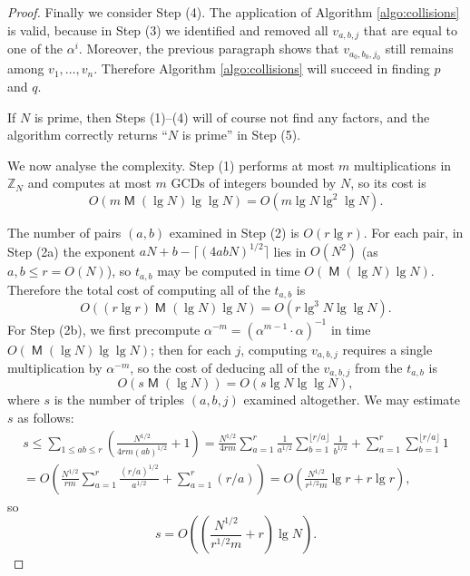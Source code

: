 \documentclass[reqno]{amsart}
\theoremstyle{remark}
\numberwithin{equation}{section}
\numberwithin{thm}{section}
\newcommand{\ZZ}{\mathbb{Z}}
\DeclareMathOperator{\MM}{\mathsf{M}}
\renewcommand{\leq}{\leqslant}
\begin{document}
\begin{proof}
  Finally we consider Step (4).
  The application of Algorithm \ref{algo:collisions} is valid,
  because in Step (3) we identified and removed all $v_{a,b,j}$ that are
  equal to one of the $\alpha^i$.
  Moreover, the previous paragraph shows that $v_{a_0,b_0,j_0}$ still remains
  among $v_1, \ldots, v_n$.
  Therefore Algorithm \ref{algo:collisions} will succeed in finding $p$ and $q$.

  If $N$ is prime, then Steps (1)--(4) will of course not find any factors,
  and the algorithm correctly returns ``$N$ is prime'' in Step (5).

  We now analyse the complexity.
  Step (1) performs at most $m$ multiplications in $\ZZ_N$ and computes at most
  $m$ GCDs of integers bounded by $N$, so its cost is
    \[ O(m \MM(\lg N) \lg \lg N) = O(m \lg N \lg^2 \lg N). \]

  The number of pairs $(a,b)$ examined in Step (2) is $O(r \lg r)$.
  For each pair, in Step (2a) the exponent $aN  + b - \lceil (4abN)^{1/2} \rceil$
  lies in $O(N^2)$ (as $a, b \leq r = O(N)$),
  so $t_{a,b}$ may be computed in time $O(\MM(\lg N) \lg N)$.
  Therefore the total cost of computing all of the $t_{a,b}$ is
    \[ O((r \lg r) \MM(\lg N) \lg N) = O(r \lg^3 N \lg \lg N). \]
  For Step (2b), we first precompute $\alpha^{-m} = (\alpha^{m-1} \cdot \alpha)^{-1}$
  in time $O(\MM(\lg N) \lg \lg N)$;
  then for each $j$, computing $v_{a,b,j}$ requires a single multiplication
  by $\alpha^{-m}$, so the cost of deducing all of the $v_{a,b,j}$
  from the $t_{a,b}$ is
    \[ O(s \MM(\lg N)) = O(s \lg N \lg \lg N), \]
  where $s$ is the number of triples $(a,b,j)$ examined altogether.
  We may estimate $s$ as follows:
  \begin{multline*}
  s \leq \sum_{1 \leq ab \leq r} \left(\frac{N^{1/2}}{4rm(ab)^{1/2}} + 1\right)
    = \frac{N^{1/2}}{4rm} \sum_{a=1}^r \frac{1}{a^{1/2}} \sum_{b=1}^{\lfloor r/a \rfloor} \frac{1}{b^{1/2}} + \sum_{a=1}^r \sum_{b=1}^{\lfloor r/a \rfloor} 1 \\
    = O\left(\frac{N^{1/2}}{rm} \sum_{a=1}^r \frac{(r/a)^{1/2}}{a^{1/2}} + \sum_{a=1}^r (r/a) \right)
    = O\left(\frac{N^{1/2}}{r^{1/2} m} \lg r + r \lg r \right),
  \end{multline*}
  so
    \[ s = O\left(\left(\frac{N^{1/2}}{r^{1/2} m} + r\right) \lg N\right). \]


\end{proof}
\end{document}
